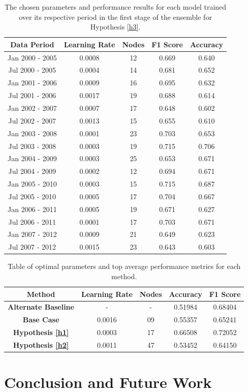 \documentclass{UoYCSproject}
\begin{document}
\begin{table}[h]
    \centering
    \begin{tabular}{|c|c|c|c|c|} \hline
        \textbf{Data Period} & \textbf{Learning Rate} & \textbf{Nodes} & \textbf{F1 Score} & \textbf{Accuracy} \\ \hline
        Jan 2000 - 2005 & 0.0008 & 12 & 0.669 & 0.640\\
        Jul 2000 - 2005 & 0.0004 & 14 & 0.681 & 0.652\\
        Jan 2001 - 2006 & 0.0009 & 16 & 0.695 & 0.632\\
        Jul 2001 - 2006 & 0.0017 & 19 & 0.688 & 0.614\\
        Jan 2002 - 2007 & 0.0007 & 17 & 0.648 & 0.602\\
        Jul 2002 - 2007 & 0.0013 & 15 & 0.655 & 0.610\\
        Jan 2003 - 2008 & 0.0001 & 23 & 0.703 & 0.653\\
        Jul 2003 - 2008 & 0.0003 & 19 & 0.715 & 0.706\\
        Jan 2004 - 2009 & 0.0003 & 25 & 0.653 & 0.671\\
        Jul 2004 - 2009 & 0.0002 & 12 & 0.694 & 0.671\\
        Jan 2005 - 2010 & 0.0003 & 15 & 0.715 & 0.687\\
        Jul 2005 - 2010 & 0.0005 & 17 & 0.704 & 0.667\\
        Jan 2006 - 2011 & 0.0005 & 19 & 0.671 & 0.627\\
        Jul 2006 - 2011 & 0.0001 & 17 & 0.703 & 0.671\\
        Jan 2007 - 2012 & 0.0009 & 21 & 0.649 & 0.623\\
        Jul 2007 - 2012 & 0.0015 & 23 & 0.643 & 0.603\\
        \hline
    \end{tabular}
    \caption{The chosen parameters and performance results for each model trained over its respective period in the first stage of the ensemble for Hypothesis \ref{h3}.}
    \label{tab:h3_stage1}
\end{table}




\begin{table}[h]
    \centering
    \begin{tabular}{|c|c|c|c|c|} \hline
        \textbf{Method} & \textbf{Learning Rate} & \textbf{Nodes} & \textbf{Accuracy} & \textbf{F1 Score} \\ \hline
        \textbf{Alternate Baseline} & - & - & 0.51984 & 0.68404 \\
        \textbf{Base Case} & 0.0016 & 09 & 0.55357 & 0.65241 \\
        \textbf{Hypothesis \ref{h1}} & 0.0003 & 17 & 0.66508 & 0.72052 \\
        \textbf{Hypothesis \ref{h2}} & 0.0011 & 47 & 0.53452 & 0.64150 \\
        \hline
    \end{tabular}
    \caption{Table of optimal parameters and top average performance metrics for each method.}
    \label{tab:test_results}
\end{table}



\chapter{Conclusion and Future Work}
\label{cha:conclusions}

\printbibliography
\end{document}
